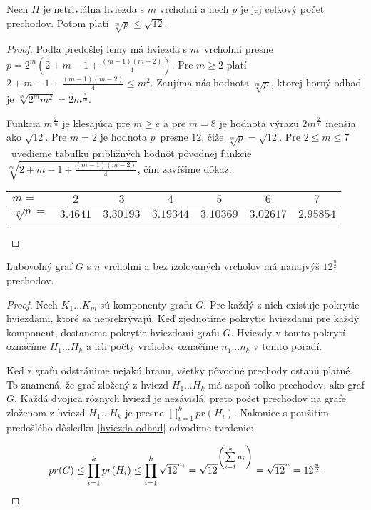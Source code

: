\begin{dosl}
    \label{hviezda-odhad}
    Nech $H$ je netriviálna hviezda s $m$ vrcholmi a nech $p$ je jej celkový počet prechodov. Potom platí $\sqrt[m]{p} \leq
    \sqrt{12}$.
\end{dosl}
\begin{proof}
    Podľa predošlej lemy má hviezda s $m$ vrcholmi presne $p = 2^m(2 + m-1 + \frac{(m-1)(m-2)}{4})$. Pre $m \ge 2$
    platí $2 + m-1 + \frac{(m-1)(m-2)}{4} \leq m^2$. Zaujíma nás hodnota $\sqrt[m]{p}$, ktorej horný odhad je
    $\sqrt[m]{2^m m^2} = 2 m^{\frac{2}{m}}$.

    Funkcia $m^{\frac{2}{m}}$ je klesajúca pre $m \ge e$ a pre
    $m = 8$ je hodnota výrazu $2m^{\frac{2}{m}}$ menšia ako $\sqrt{12}$. Pre $m=2$ je hodnota $p$ presne $12$, čiže
    $\sqrt[m]{p} = \sqrt{12}$. Pre $2 \leq m \leq 7$ uvedieme tabuľku približných hodnôt pôvodnej funkcie
    $\sqrt[m]{2 + m-1 + \frac{(m-1)(m-2)}{4}}$, čím zavŕšime dôkaz:

    \begin{tabular}{| l | c | c | c | c | c | c |} \hline
        $m =            $&$ 2 $&$ 3 $&$ 4 $&$ 5 $&$ 6 $&$ 7 $ \\ \hline
        $\sqrt[m]{p} =  $&$ 3.4641 $&$ 3.30193 $&$ 3.19344 $&$ 3.10369 $&$ 3.02617 $&$ 2.95854$ \\ \hline
    \end{tabular}
\end{proof}
\begin{dosl}
    Ľubovoľný graf $G$ s $n$ vrcholmi a bez izolovaných vrcholov má nanajvýš $12^{\frac{n}{2}}$ prechodov.
\end{dosl}
\begin{proof}
    Nech $K_1 \ldots K_m$ sú komponenty grafu $G$. Pre každý z nich existuje pokrytie hviezdami, ktoré
    sa neprekrývajú. Keď zjednotíme pokrytie hviezdami pre každý komponent, dostaneme pokrytie hviezdami
    grafu $G$. Hviezdy v tomto pokrytí označíme $H_1 \ldots H_k$ a ich počty vrcholov označíme $n_1 \ldots n_k$
    v tomto poradí.

    Keď z grafu odstránime nejakú hranu, všetky pôvodné prechody ostanú platné. To znamená, že graf zložený
    z hviezd $H_1 \ldots H_k$ má aspoň toľko prechodov, ako graf $G$. Každá dvojica rôznych hviezd je nezávislá,
    preto počet prechodov na grafe zloženom z hviezd $H_1 \ldots H_k$ je presne $\prod \limits_{i=1}^{k} pr(H_i)$.
    Nakoniec s použitím predošlého dôsledku \ref{hviezda-odhad} odvodíme tvrdenie:

    $$ pr(G) \leq \prod \limits_{i=1}^{k} pr(H_i) \leq \prod \limits_{i=1}^{k} \sqrt{12}^{n_i} = \sqrt{12}\rule{0pt}{17pt}^{\left(\sum \limits_{i=1}^{k} n_i \right)} = \sqrt{12}^{n} = 12^{\frac{n}{2}}.$$
\end{proof}

